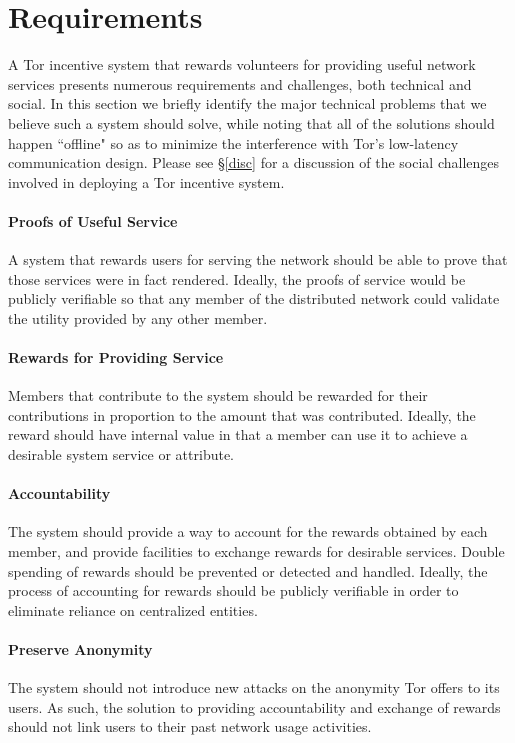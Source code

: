 \section{Requirements} \label{reqs}

A Tor incentive system that rewards volunteers for providing useful network
services presents numerous requirements and challenges, both technical and
social. In this section we briefly identify the major technical problems that we
believe such a system should solve, while noting that all of the solutions
should happen ``offline" so as to minimize the interference with Tor's
low-latency communication design. Please see \S\ref{disc} for a discussion of
the social challenges involved in deploying a Tor incentive system.

\paragraph{Proofs of Useful Service} A system that rewards users for serving the
network should be able to prove that those services were in fact rendered.
Ideally, the proofs of service would be publicly verifiable so that any member
of the distributed network could validate the utility provided by any other
member.

\paragraph{Rewards for Providing Service} Members that contribute to the system
should be rewarded for their contributions in proportion to the amount that was
contributed. Ideally, the reward should have internal value in that a member can
use it to achieve a desirable system service or attribute.

\paragraph{Accountability} The system should provide a way to account for the
rewards obtained by each member, and provide facilities to exchange rewards for
desirable services. Double spending of rewards should be prevented or detected
and handled. Ideally, the process of accounting for rewards should be publicly
verifiable in order to eliminate reliance on centralized entities.

\paragraph{Preserve Anonymity} The system should not introduce new attacks
on the anonymity Tor offers to its users. As such, the solution to providing
accountability and exchange of rewards should not link users to their past
network usage activities.

